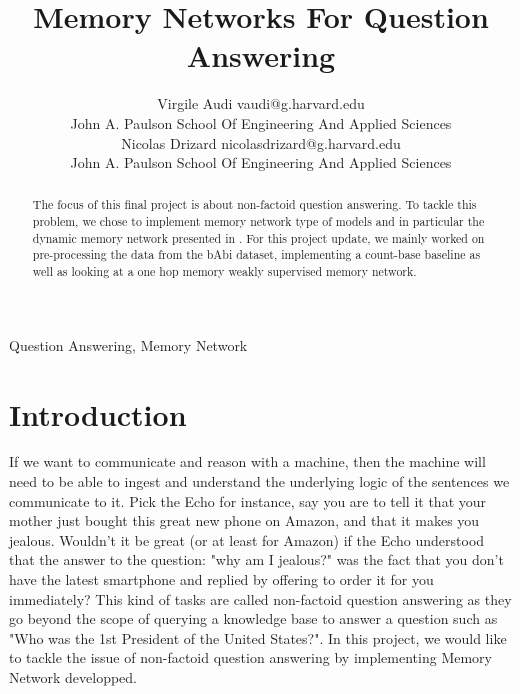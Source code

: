 \documentclass[twoside,11pt]{article}
\begin{document}
\title{Memory Networks For Question Answering}

\author{\name Virgile Audi \email vaudi@g.harvard.edu \\
       \addr  John A. Paulson School Of Engineering And Applied Sciences\\
       \AND
       \name Nicolas Drizard \email nicolasdrizard@g.harvard.edu \\
       \addr John A. Paulson School Of Engineering And Applied Sciences}


\maketitle
\vspace{2cm}
\begin{abstract}%
The focus of this final project is about non-factoid question answering. To tackle this problem, we chose to implement memory network type of models and in particular the dynamic memory network presented in \cite{dmn}. For this project update, we mainly worked on pre-processing the data from the bAbi dataset, implementing a count-base baseline as well as looking at a one hop memory weakly supervised memory network.
\end{abstract}

\begin{keywords}
  Question Answering, Memory Network
\end{keywords}
\vspace{2cm}
\section{Introduction}

If we want to communicate and reason with a machine, then the machine will need to be able to ingest and understand the underlying logic of the sentences we communicate to it. Pick the Echo for instance, say you are to tell it that your mother just bought this great new phone on Amazon, and that it makes you jealous. Wouldn't it be great (or at least for Amazon) if the Echo understood that the answer to the question: "why am I jealous?" was the fact that you don't have the latest smartphone and replied by offering to order it for you immediately? This kind of tasks are called non-factoid question answering as they go beyond the scope of querying a knowledge base to answer a question such as "Who was the 1st President of the United States?". In this project, we would like to tackle the issue of non-factoid question answering by implementing Memory Network developped.
\end{document}
